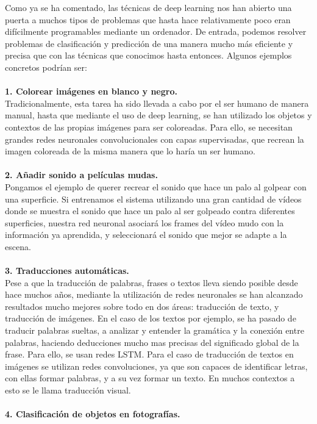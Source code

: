 Como ya se ha comentado, las técnicas de deep learning nos han abierto una puerta a muchos tipos de problemas que hasta hace relativamente poco eran difícilmente programables mediante un ordenador. De entrada, podemos resolver problemas de clasificación y predicción de una manera mucho más eficiente y precisa que con las técnicas que conocimos hasta entonces. Algunos ejemplos concretos podrían ser:\\\\
\textbf{1. Colorear imágenes en blanco y negro.}\\
Tradicionalmente, esta tarea ha sido llevada a cabo por el ser humano de manera manual, hasta que mediante el uso de deep learning, se han utilizado los objetos y contextos de las propias imágenes para ser coloreadas. Para ello, se necesitan grandes redes neuronales convolucionales con capas supervisadas, que recrean la imagen coloreada de la misma manera que lo haría un ser humano.\\
\\\textbf{2. Añadir sonido a películas mudas.}\\
Pongamos el ejemplo de querer recrear el sonido que hace un palo al golpear con una superficie. Si entrenamos el sistema utilizando una gran cantidad de vídeos donde se muestra el sonido que hace un palo al ser golpeado contra diferentes superficies, nuestra red neuronal asociará los frames del vídeo mudo con la información ya aprendida, y seleccionará el sonido que mejor se adapte a la escena.\\
\\\textbf{3. Traducciones automáticas.}\\
Pese a que la traducción de palabras, frases o textos lleva siendo posible desde hace muchos años, mediante la utilización de redes neuronales se han alcanzado resultados mucho mejores sobre todo en dos áreas: traducción de texto, y traducción de imágenes. En el caso de los textos por ejemplo, se ha pasado de traducir palabras sueltas, a analizar y entender la gramática y la conexión entre palabras, haciendo deducciones mucho mas precisas del significado global de la frase. Para ello, se usan redes LSTM. Para el caso de traducción de textos en imágenes se utilizan redes convoluciones, ya que son capaces de identificar letras, con ellas formar palabras, y a su vez formar un texto. En muchos contextos a esto se le llama traducción visual.\\
\\\textbf{4. Clasificación de objetos en fotografías.}\\
